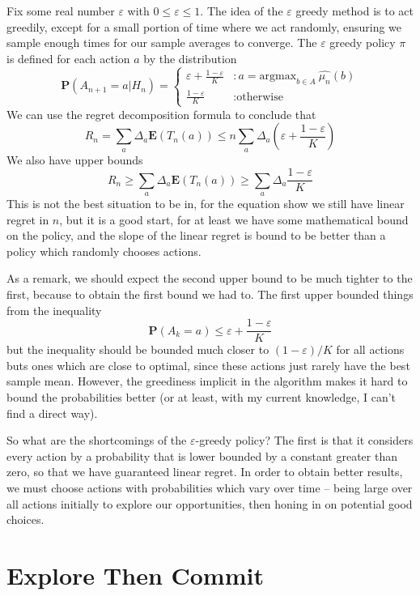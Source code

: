 Fix some real number $\varepsilon$ with $0 \leq \varepsilon \leq 1$. The idea of the $\varepsilon$ greedy method is to act greedily, except for a small portion of time where we act randomly, ensuring we sample enough times for our sample averages to converge. The $\varepsilon$ greedy policy $\pi$ is defined for each action $a$ by the distribution
%
\[ \mathbf{P}(A_{n+1} = a | H_n)  =
        \begin{cases} \varepsilon + \frac{1 - \varepsilon}{K} &: a = \text{argmax}_{b \in A}\ \widehat{\mu_n}(b)\\
        \frac{1 - \varepsilon}{K} &: \text{otherwise}
        \end{cases} \]
%
We can use the regret decomposition formula to conclude that
%
\[ R_n = \sum_a \Delta_a \mathbf{E}(T_n(a)) \leq n \sum_a \Delta_a \left( \varepsilon + \frac{1 - \varepsilon}{K} \right) \]
%
We also have upper bounds
%
\[ R_n \geq \sum_a \Delta_a \mathbf{E}(T_n(a)) \geq \sum_a \Delta_a \frac{1 - \varepsilon}{K} \]
%
This is not the best situation to be in, for the equation show we still have linear regret in $n$, but it is a good start, for at least we have some mathematical bound on the policy, and the slope of the linear regret is bound to be better than a policy which randomly chooses actions.

As a remark, we should expect the second upper bound to be much tighter to the first, because to obtain the first bound we had to. The first upper bounded things from the inequality
%
\[ \mathbf{P}(A_k = a) \leq \varepsilon + \frac{1 - \varepsilon}{K} \]
%
but the inequality should be bounded much closer to $(1 - \varepsilon)/K$ for all actions buts ones which are close to optimal, since these actions just rarely have the best sample mean. However, the greediness implicit in the algorithm makes it hard to bound the probabilities better (or at least, with my current knowledge, I can't find a direct way).

So what are the shortcomings of the $\varepsilon$-greedy policy? The first is that it considers every action by a probability that is lower bounded by a constant greater than zero, so that we have guaranteed linear regret. In order to obtain better results, we must choose actions with probabilities which vary over time -- being large over all actions initially to explore our opportunities, then honing in on potential good choices.

\section{Explore Then Commit}

